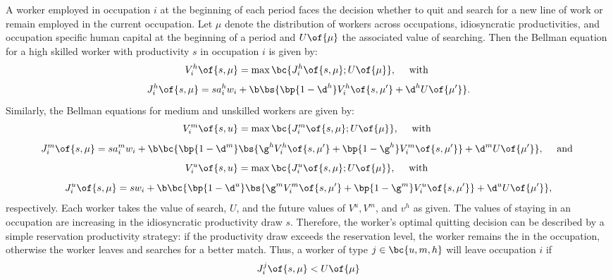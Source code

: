 \documentclass[12pt]{article}
\theoremstyle{definition}
\begin{document}
A worker employed in occupation $i$ at the beginning of each period faces the decision whether to quit and search for a new line of work or remain employed in the current occupation. Let $\mu$ denote the distribution of workers across occupations, idiosyncratic productivities, and occupation specific human capital at the beginning of a period and $U\of{\mu}$ the associated value of searching. Then the Bellman equation for a high skilled worker with productivity $s$ in occupation $i$ is given by:
\begin{equation}
    \label{4}
    V_i^h\of{s, \mu} = \max\bc{J_i^h\of{s, \mu}; U\of{\mu}},\quad \text{ with }
\end{equation}
\begin{equation}
    \label{5}
    J_i^h\of{s, \mu} = s a_i^h w_i + \b \bs{\bp{1 - \d^h} V_i^h\of{s, \mu^\prime} + \d^h U\of{\mu^{\prime}}}.
\end{equation}
Similarly, the Bellman equations for medium and unskilled workers are given by:
\begin{equation}
    \label{6}
    V_i^m\of{s, u} = \max\bc{J_i^m\of{s, \mu}; U\of{\mu}},\quad \text{ with }
\end{equation}
\begin{equation}
    \label{7}
    J_i^m\of{s, \mu} = s a_i^m w_i + \b \bc{\bp{1 - \d^m} \bs{\g^hV_i^h\of{s, \mu^\prime} + \bp{1-\g^h} V_i^m\of{s, \mu^{\prime}}} + \d^m U\of{\mu^{\prime}}}, \quad \text{ and }
\end{equation}
\begin{equation}
    \label{8}
    V_i^u\of{s, u} = \max\bc{J_i^u\of{s, \mu}; U\of{\mu}},\quad \text{ with }
\end{equation}
\begin{equation}
    \label{9}
    J_i^u\of{s, \mu} = s w_i + \b \bc{\bp{1 - \d^u} \bs{\g^mV_i^m\of{s, \mu^\prime} + \bp{1-\g^m} V_i^u\of{s, \mu^{\prime}}} + \d^u U\of{\mu^{\prime}}},
\end{equation}
respectively. Each worker takes the value of search, $U$, and the future values of $V^u, V^m$, and $v^h$ as given. The values of staying in an occupation are increasing in the idiosyncratic productivity draw $s$. Therefore, the worker's optimal quitting decision can be described by a simple reservation productivity strategy: if the productivity draw exceeds the reservation level, the worker remains the in the occupation, otherwise the worker leaves and searches for a better match. Thus, a worker of type $j \in \bc{u, m, h}$ will leave occupation $i$ if 
\begin{equation}
    \label{10}
    J_i^j\of{s, \mu} < U\of{\mu} 
\end{equation}
\end{document}
